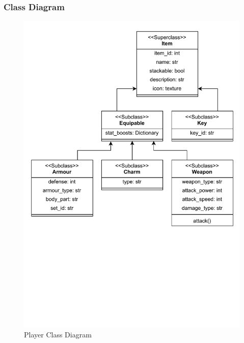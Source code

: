 \documentclass{article}
\begin{document}
        \subsubsection{Class Diagram}
        \begin{figure}[H]
                \centering
                \includegraphics[width = 0.9\columnwidth, clip, trim = 0 270 0 25]{images/design/Item_Class_Diagram.pdf}
                \caption{Player Class Diagram}
        \end{figure}
\end{document}
